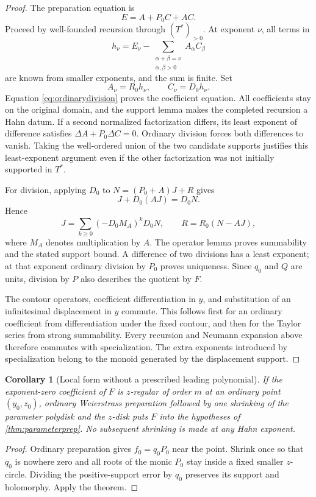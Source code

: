 \documentclass[11pt,letterpaper]{article}
\newtheorem{corollary}[theorem]{Corollary}
\theoremstyle{definition}
\theoremstyle{remark}
\begin{document}
\begin{proof}
The preparation equation is
\[
 E=A+P_0C+AC.
\]
Proceed by well-founded recursion through $(T^*)_{>0}$. At exponent $\nu$, all terms in
\[
 h_\nu=E_\nu-
       \sum_{\substack{\alpha+\beta=\nu\\\alpha,\beta>0}}A_\alpha C_\beta
\]
are known from smaller exponents, and the sum is finite. Set
\[
 A_\nu=R_0h_\nu,\qquad C_\nu=D_0h_\nu.
\]
Equation \eqref{eq:ordinarydivision} proves the coefficient equation. All coefficients stay on the original domain, and the support lemma makes the completed recursion a Hahn datum. If a second normalized factorization differs, its least exponent of difference satisfies $\Delta A+P_0\Delta C=0$. Ordinary division forces both differences to vanish. Taking the well-ordered union of the two candidate supports justifies this least-exponent argument even if the other factorization was not initially supported in $T^*$.

For division, applying $D_0$ to $N=(P_0+A)J+R$ gives
\[
 J+D_0(AJ)=D_0N.
\]
Hence
\begin{equation}\label{eq:parameterneumann}
 J=\sum_{k\geq0}(-D_0M_A)^kD_0N,
 \qquad R=R_0(N-AJ),
\end{equation}
where $M_A$ denotes multiplication by $A$. The operator lemma proves summability and the stated support bound. A difference of two divisions has a least exponent; at that exponent ordinary division by $P_0$ proves uniqueness. Since $q_0$ and $Q$ are units, division by $P$ also describes the quotient by $F$.

The contour operators, coefficient differentiation in $y$, and substitution of an infinitesimal displacement in $y$ commute. This follows first for an ordinary coefficient from differentiation under the fixed contour, and then for the Taylor series from strong summability. Every recursion and Neumann expansion above therefore commutes with specialization. The extra exponents introduced by specialization belong to the monoid generated by the displacement support.
\end{proof}

\begin{corollary}[Local form without a prescribed leading polynomial]
If the exponent-zero coefficient of $F$ is $z$-regular of order $m$ at an ordinary point $(y_0,z_0)$, ordinary Weierstrass preparation followed by one shrinking of the parameter polydisk and the $z$-disk puts $F$ into the hypotheses of \cref{thm:parameterprep}. No subsequent shrinking is made at any Hahn exponent.
\end{corollary}
\begin{proof}
Ordinary preparation gives $f_0=q_0P_0$ near the point. Shrink once so that $q_0$ is nowhere zero and all roots of the monic $P_0$ stay inside a fixed smaller $z$-circle. Dividing the positive-support error by $q_0$ preserves its support and holomorphy. Apply the theorem.
\end{proof}
\end{document}
